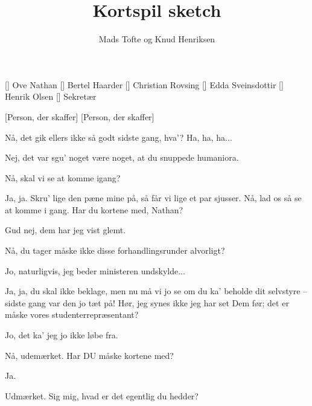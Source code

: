\documentclass[a4paper,11pt]{article}
\title{Kortspil sketch}
\author{Mads Tofte og Knud Henriksen}
\begin{document}
\maketitle

\begin{roles}
    [] Ove Nathan
    [] Bertel Haarder
    [] Christian Rovsing
    [] Edda Sveinsdottir
    [] Henrik Olsen
    [] Sekretær
\end{roles}

\begin{props}
[Person, der skaffer]
[Person, der skaffer]
\end{props}

\begin{sketch}



 Nå, det gik ellers ikke så godt sidste gang, hva'? Ha, ha, ha...

 Nej, det var sgu' noget være noget, at du snuppede humaniora.

 Nå, skal vi se at komme igang?

 Ja, ja. Skru' lige den pæne mine på, så får vi lige et par sjusser.  Nå, lad os så se at komme i gang. Har du kortene med, Nathan?

 Gud nej, dem har jeg vist glemt.

 Nå, du tager måske ikke disse forhandlingsrunder alvorligt?

 Jo, naturligvis, jeg beder ministeren undskylde...

 Ja, ja, du skal ikke beklage, men nu må vi jo se  om du ka' beholde dit selvstyre -- sidste gang var den jo tæt på!  Hør, jeg synes ikke jeg har set Dem før; det er måske vores studenterrepræsentant?

 Jo, det ka' jeg jo ikke løbe fra.

 Nå, udemærket. Har DU måske kortene med?

 Ja. 

 Udmærket. Sig mig, hvad er det egentlig du hedder?


\end{sketch}
\end{document}
